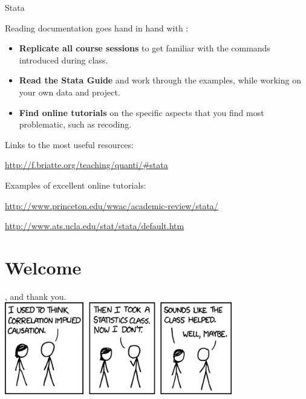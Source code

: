 \documentclass{beamer}
\begin{document}
	\begin{frame}[t]{Stata }

		Reading documentation goes hand in hand with :

		\begin{itemize}
			\item \textbf{Replicate all course sessions} to get familiar with the commands introduced during class.
			\item \textbf{Read the Stata Guide} and work through the examples, while working on your own data and project.
			\item \textbf{Find online tutorials} on the specific aspects that you find most problematic, such as recoding.
		\end{itemize}
		
		Links to the most useful resources:
		
		\url{http://f.briatte.org/teaching/quanti/\#stata}
		
		\vspace{1em}
		
		Examples of excellent online tutorials:
		
		\url{http://www.princeton.edu/wwac/academic-review/stata/}
				
		\url{http://www.ats.ucla.edu/stat/stata/default.htm}
	\end{frame}

	\section*{Welcome}

	\begin{frame}[t,plain]
			\vspace{.2\paperwidth}
		\begin{center}
			{\Large {}, and thank you.}\\
			\vspace{.1\paperwidth}
			\href{http://xkcd.com/552/}{\includegraphics[height=4cm]{images/xkcd-correlation.jpg}}
		\end{center}
	\end{frame}
\end{document}
